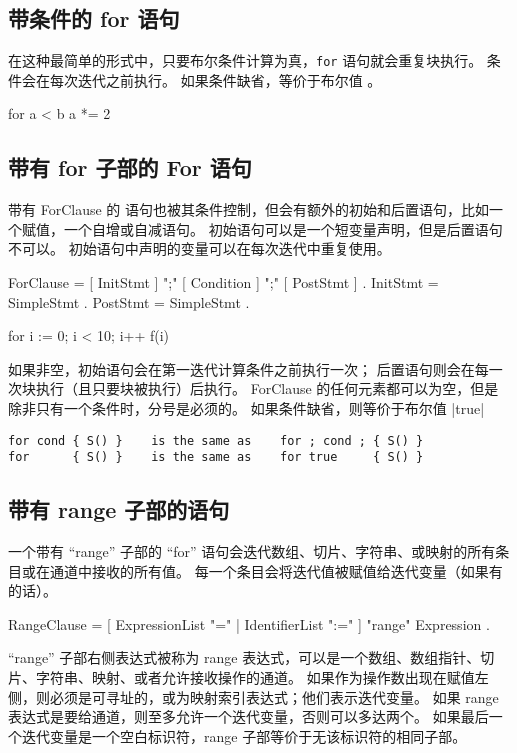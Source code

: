 \subsection{带条件的 for 语句}
在这种最简单的形式中，只要布尔条件计算为真，\verb|for| 语句就会重复块执行。
条件会在每次迭代之前执行。
如果条件缺省，等价于布尔值 。
\begin{golang}
for a < b {
	a *= 2
}
\end{golang}

\subsection{带有 for 子部的 For 语句}
带有 ForClause 的  语句也被其条件控制，但会有额外的初始和后置语句，比如一个赋值，一个自增或自减语句。
初始语句可以是一个短变量声明，但是后置语句不可以。
初始语句中声明的变量可以在每次迭代中重复使用。
\begin{EBNF}
ForClause = [ InitStmt ] ";" [ Condition ] ";" [ PostStmt ] .
InitStmt = SimpleStmt .
PostStmt = SimpleStmt .
\end{EBNF}




\begin{golang}
for i := 0; i < 10; i++ {
	f(i)
}
\end{golang}

如果非空，初始语句会在第一迭代计算条件之前执行一次；
后置语句则会在每一次块执行（且只要块被执行）后执行。
ForClause 的任何元素都可以为空，但是除非只有一个条件时，分号是必须的。
如果条件缺省，则等价于布尔值 \code|true|
\begin{lstlisting}
for cond { S() }    is the same as    for ; cond ; { S() }
for      { S() }    is the same as    for true     { S() }
\end{lstlisting}

\subsection{带有 range 子部的语句}
一个带有 ``range'' 子部的 ``for'' 语句会迭代数组、切片、字符串、或映射的所有条目或在通道中接收的所有值。
每一个条目会将迭代值被赋值给迭代变量（如果有的话）。
\begin{EBNF}
RangeClause = [ ExpressionList "=" | IdentifierList ":=" ] "range" Expression .
\end{EBNF}

``range'' 子部右侧表达式被称为 range 表达式，可以是一个数组、数组指针、切片、字符串、映射、或者允许接收操作的通道。
如果作为操作数出现在赋值左侧，则必须是可寻址的，或为映射索引表达式；他们表示迭代变量。
如果 range 表达式是要给通道，则至多允许一个迭代变量，否则可以多达两个。
如果最后一个迭代变量是一个空白标识符，range 子部等价于无该标识符的相同子部。

